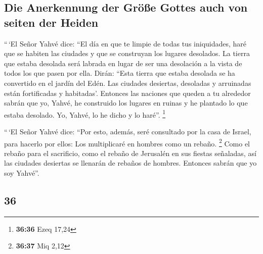 \begin{paracol}{2}
\hypertarget{die-anerkennung-der-gruxf6uxdfe-gottes-auch-von-seiten-der-heiden}{%
\subsection{Die Anerkennung der Größe Gottes auch von seiten der
Heiden}\label{die-anerkennung-der-gruxf6uxdfe-gottes-auch-von-seiten-der-heiden}}

 ``\,`El Señor Yahvé dice: ``El día en que te limpie de
todas tus iniquidades, haré que se habiten las ciudades y que se
construyan los lugares desolados.  La tierra que estaba
desolada será labrada en lugar de ser una desolación a la vista de todos
los que pasen por ella.  Dirán: ``Esta tierra que estaba
desolada se ha convertido en el jardín del Edén. Las ciudades desiertas,
desoladas y arruinadas están fortificadas y habitadas'. 
Entonces las naciones que queden a tu alrededor sabrán que yo, Yahvé, he
construido los lugares en ruinas y he plantado lo que estaba desolado.
Yo, Yahvé, lo he dicho y lo haré''. \footnote{\textbf{36:36} Ezeq 17,24}

 ``\,`El Señor Yahvé dice: ``Por esto, además, seré
consultado por la casa de Israel, para hacerlo por ellos: Los
multiplicaré en hombres como un rebaño. \footnote{\textbf{36:37} Miq
  2,12}  Como el rebaño para el sacrificio, como el
rebaño de Jerusalén en sus fiestas señaladas, así las ciudades desiertas
se llenarán de rebaños de hombres. Entonces sabrán que yo soy Yahvé''.

\switchcolumn
\begin{otherlanguage}{english}

\hypertarget{section-71}{%
\section{36}\label{section-71}}


\end{otherlanguage}
\end{paracol}
